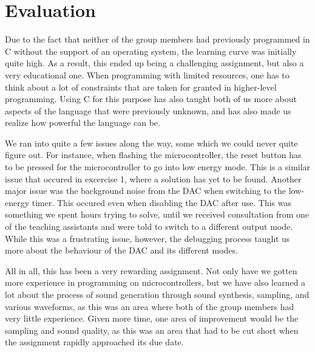 \section{Evaluation}

Due to the fact that neither of the group members had previously programmed in C without the support of an operating system, the learning curve was initially quite high. As a result, this ended up being a challenging assignment, but also a very educational one. When programming with limited resources, one has to think about a lot of constraints that are taken for granted in higher-level programming. Using C for this purpose has also taught both of us more about aspects of the language that were previously unknown, and has also made us realize how powerful the language can be.
	
	We ran into quite a few issues along the way, some which we could never quite figure out. For instance, when flashing the microcontroller, the reset button has to be pressed for the microcontroller to go into low energy mode. This is a similar issue that occured in excercise 1, where a solution has yet to be found. 
	Another major issue was the background noise from the DAC when switching to the low-energy timer. This occured even when disabling the DAC after use. This was something we spent hours trying to solve, until we received consultation from one of the teaching assistants and were told to switch to a different output mode. While this was a frustrating issue, however, the debugging process taught us more about the behaviour of the DAC and its different modes.
	
All in all, this has been a very rewarding assignment. Not only have we gotten more experience in programming on microcontrollers, but we have also learned a lot about the process of sound generation through sound synthesis, sampling, and various waveforms, as this was an area where both of the group members had very little experience. Given more time, one area of improvement would be the sampling and sound quality, as this was an area that had to be cut short when the assignment rapidly approached its due date.